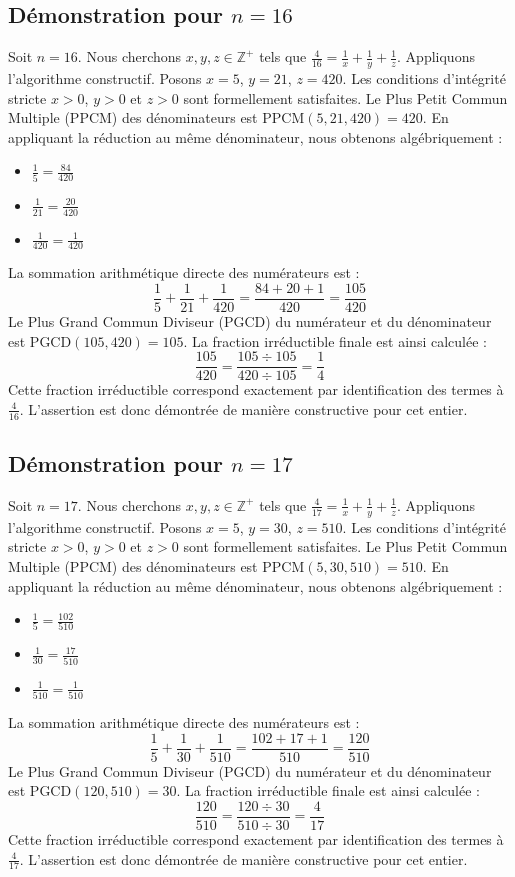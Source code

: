 \documentclass[11pt,a4paper]{article}
\begin{document}
\subsection{Démonstration pour $n = 16$}
Soit $n = 16$. Nous cherchons $x, y, z \in \mathbb{Z}^{+}$ tels que $\frac{4}{16} = \frac{1}{x} + \frac{1}{y} + \frac{1}{z}$.
Appliquons l'algorithme constructif. Posons $x = 5$, $y = 21$, $z = 420$.
Les conditions d'intégrité stricte $x > 0$, $y > 0$ et $z > 0$ sont formellement satisfaites.
Le Plus Petit Commun Multiple (PPCM) des dénominateurs est $\text{PPCM}(5, 21, 420) = 420$.
En appliquant la réduction au même dénominateur, nous obtenons algébriquement :
\begin{itemize}
    \item $\frac{1}{5} = \frac{84}{420}$
    \item $\frac{1}{21} = \frac{20}{420}$
    \item $\frac{1}{420} = \frac{1}{420}$
\end{itemize}
La sommation arithmétique directe des numérateurs est :
$$ \frac{1}{5} + \frac{1}{21} + \frac{1}{420} = \frac{84 + 20 + 1}{420} = \frac{105}{420} $$
Le Plus Grand Commun Diviseur (PGCD) du numérateur et du dénominateur est $\text{PGCD}(105, 420) = 105$.
La fraction irréductible finale est ainsi calculée :
$$ \frac{105}{420} = \frac{105 \div 105}{420 \div 105} = \frac{1}{4} $$
Cette fraction irréductible correspond exactement par identification des termes à $\frac{4}{16}$. L'assertion est donc démontrée de manière constructive pour cet entier.

\subsection{Démonstration pour $n = 17$}
Soit $n = 17$. Nous cherchons $x, y, z \in \mathbb{Z}^{+}$ tels que $\frac{4}{17} = \frac{1}{x} + \frac{1}{y} + \frac{1}{z}$.
Appliquons l'algorithme constructif. Posons $x = 5$, $y = 30$, $z = 510$.
Les conditions d'intégrité stricte $x > 0$, $y > 0$ et $z > 0$ sont formellement satisfaites.
Le Plus Petit Commun Multiple (PPCM) des dénominateurs est $\text{PPCM}(5, 30, 510) = 510$.
En appliquant la réduction au même dénominateur, nous obtenons algébriquement :
\begin{itemize}
    \item $\frac{1}{5} = \frac{102}{510}$
    \item $\frac{1}{30} = \frac{17}{510}$
    \item $\frac{1}{510} = \frac{1}{510}$
\end{itemize}
La sommation arithmétique directe des numérateurs est :
$$ \frac{1}{5} + \frac{1}{30} + \frac{1}{510} = \frac{102 + 17 + 1}{510} = \frac{120}{510} $$
Le Plus Grand Commun Diviseur (PGCD) du numérateur et du dénominateur est $\text{PGCD}(120, 510) = 30$.
La fraction irréductible finale est ainsi calculée :
$$ \frac{120}{510} = \frac{120 \div 30}{510 \div 30} = \frac{4}{17} $$
Cette fraction irréductible correspond exactement par identification des termes à $\frac{4}{17}$. L'assertion est donc démontrée de manière constructive pour cet entier.
\end{document}

